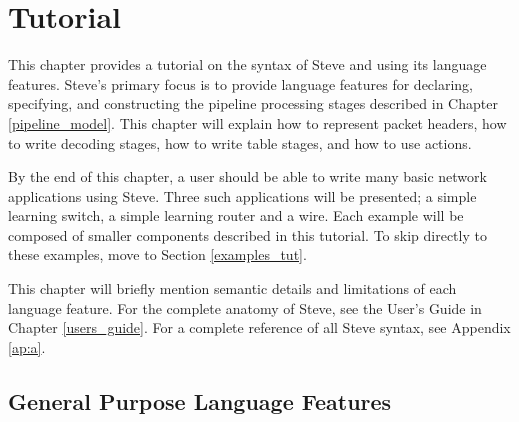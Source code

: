 \chapter{Tutorial} \label{tutorial}

This chapter provides a tutorial on the syntax of Steve and using its language features. Steve's primary focus is to provide language features for declaring, specifying, and constructing the pipeline processing stages described in Chapter \ref{pipeline_model}. This chapter will explain how to represent packet headers, how to write decoding stages, how to write table stages, and how to use actions.

By the end of this chapter, a user should be able to write many basic network applications using Steve. Three such applications will be presented; a simple learning switch, a simple learning router and a wire. Each example will be composed of smaller components described in this tutorial. To skip directly to these examples, move to Section \ref{examples_tut}.

This chapter will briefly mention semantic details and limitations of each language feature. For the complete anatomy of Steve, see the User's Guide in Chapter \ref{users_guide}. For a complete reference of all Steve syntax, see Appendix \ref{ap:a}.

\section{General Purpose Language Features} \label{gen_purp_tut}


